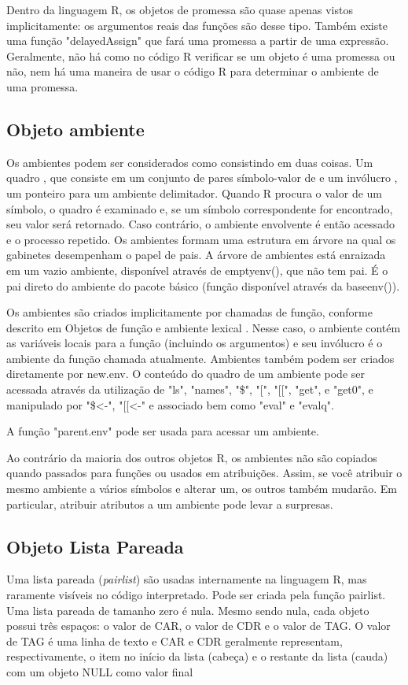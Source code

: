       Dentro da linguagem R, os objetos de promessa são quase apenas vistos implicitamente: os argumentos reais das funções são desse tipo. Também existe uma função "delayedAssign" que fará uma promessa a partir de uma expressão. Geralmente, não há como no código R verificar se um objeto é uma promessa ou não, nem há uma maneira de usar o código R para determinar o ambiente de uma promessa.

    \subsection{Objeto ambiente}
      Os ambientes podem ser considerados como consistindo em duas coisas. Um quadro , que consiste em um conjunto de pares símbolo-valor de  e um invólucro , um ponteiro para um ambiente delimitador. Quando R procura o valor de um símbolo, o quadro é examinado e, se um símbolo correspondente for encontrado, seu valor será retornado. Caso contrário, o ambiente envolvente é então acessado e o processo repetido. Os ambientes formam uma estrutura em árvore na qual os gabinetes desempenham o papel de pais. A árvore de ambientes está enraizada em um vazio ambiente, disponível através de emptyenv(), que não tem pai. É o pai direto do ambiente do pacote básico (função disponível através da baseenv()).
      
      Os ambientes são criados implicitamente por chamadas de função, conforme descrito em Objetos de função e ambiente lexical . Nesse caso, o ambiente contém as variáveis locais para a função (incluindo os argumentos) e seu invólucro é o ambiente da função chamada atualmente. Ambientes também podem ser criados diretamente por new.env. O conteúdo do quadro de um ambiente pode ser acessada através da utilização de "ls", "names", "\$", "[", "[[", "get", e "get0", e manipulado por "\$<-", "[[<-" e associado bem como "eval" e  "evalq".
      
      A função "parent.env" pode ser usada para acessar um ambiente.
      
      Ao contrário da maioria dos outros objetos R, os ambientes não são copiados quando passados para funções ou usados em atribuições. Assim, se você atribuir o mesmo ambiente a vários símbolos e alterar um, os outros também mudarão. Em particular, atribuir atributos a um ambiente pode levar a surpresas.
    
    \subsection{Objeto Lista Pareada}
      Uma lista pareada (\textit{pairlist}) são usadas internamente na linguagem R, mas raramente visíveis no código interpretado. Pode ser criada pela função pairlist. Uma lista pareada de tamanho zero é nula. Mesmo sendo nula, cada objeto possui três espaços: o valor de CAR, o valor de CDR e o valor de TAG. O valor de TAG é uma linha de texto e CAR e CDR geralmente representam, respectivamente, o item no início da lista (cabeça) e o restante da lista (cauda) com um objeto NULL como valor final
      
